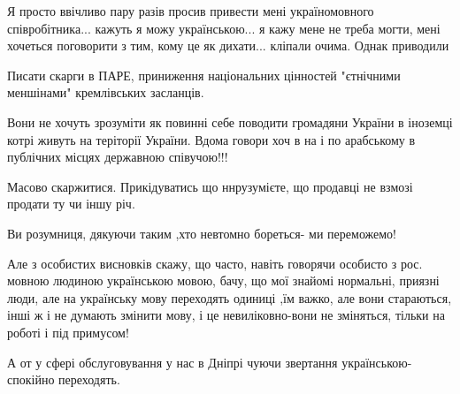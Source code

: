 \begin{itemize}
Я просто ввічливо пару разів просив привести мені україномовного співробітника...
кажуть я можу українською... я кажу мене не треба могти, мені хочеться поговорити
з тим, кому це як дихати... кліпали очима. Однак приводили

 
Писати скарги в ПАРЕ, приниження національних цінностей "єтнічними меншінами" кремлівських засланців.

 

Вони не хочуть зрозуміти як повинні себе поводити громадяни України в іноземці
котрі живуть на теріторії України. Вдома говори хоч в на і по арабському в
публічних місцях державною співучою!!!


 
Масово скаржитися. Прикідуватись що ннрузумієте, що продавці не взмозі продати ту чи іншу річ.

 
Ви розумниця, дякуючи таким ,хто невтомно бореться- ми переможемо!

Але з особистих висновків скажу, що часто, навіть говорячи особисто з рос. мовною
людиною українською мовою, бачу, що мої знайомі нормальні, приязні люди, але на
українську мову переходять одиниці ,їм важко, але вони стараються, інші ж і не
думають змінити мову, і це невиліковно-вони не зміняться, тільки на роботі і під
примусом!

А от у сфері обслуговування у нас в Дніпрі чуючи звертання українською-спокійно
переходять.


\end{itemize}
